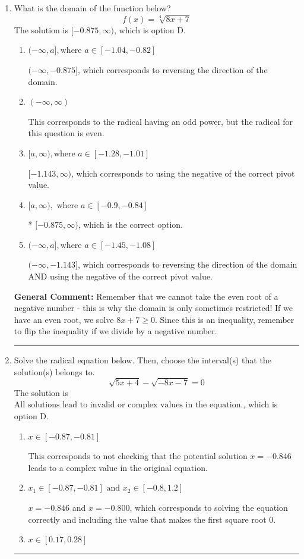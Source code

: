 \documentclass{extbook}[14pt]
\newcommand{\litem}[1]{\item #1

\rule{\textwidth}{0.4pt}}
\begin{document}
\begin{enumerate}\litem{
What is the domain of the function below?
\[ f(x) = \sqrt[4]{8 x + 7} \]
The solution is \( [-0.875, \infty) \), which is option D.\begin{enumerate}[label=\Alph*.]
\item \( (-\infty, a], \text{where } a \in [-1.04, -0.82] \)

 $(-\infty, -0.875]$, which corresponds to reversing the direction of the domain.
\item \( (-\infty, \infty) \)

This corresponds to the radical having an odd power, but the radical for this question is even.
\item \( [a, \infty), \text{where } a \in [-1.28, -1.01] \)

$[-1.143, \infty)$, which corresponds to using the negative of the correct pivot value.
\item \( [a, \infty), \text{ where } a \in [-0.9, -0.84] \)

* $[-0.875, \infty)$, which is the correct option.
\item \( (-\infty, a], \text{where } a \in [-1.45, -1.08] \)

$(-\infty, -1.143]$, which corresponds to reversing the direction of the domain AND using the negative of the correct pivot value.
\end{enumerate}

\textbf{General Comment:} Remember that we cannot take the even root of a negative number - this is why the domain is only sometimes restricted! If we have an even root, we solve $8 x + 7 \geq 0$. Since this is an inequality, remember to flip the inequality if we divide by a negative number.
}
\litem{
Solve the radical equation below. Then, choose the interval(s) that the solution(s) belongs to.
\[ \sqrt{5 x + 4} - \sqrt{-8 x - 7} = 0 \]
The solution is \( \text{All solutions lead to invalid or complex values in the equation.} \), which is option D.\begin{enumerate}[label=\Alph*.]
\item \( x \in [-0.87,-0.81] \)

This corresponds to not checking that the potential solution $x = -0.846$ leads to a complex value in the original equation.
\item \( x_1 \in [-0.87, -0.81] \text{ and } x_2 \in [-0.8,1.2] \)

$x = -0.846$ and $x = -0.800$, which corresponds to solving the equation correctly and including the value that makes the first square root 0.
\item \( x \in [0.17,0.28] \)


\end{enumerate}}
\end{enumerate}
\end{document}
